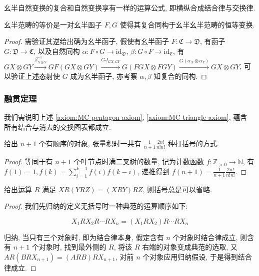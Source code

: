 \begin{corollary}
    幺半自然变换的复合和自然变换享有一样的运算公式, 即横纵合成结合律与交换律.
\end{corollary}

\begin{corollary}
    幺半范畴的等价是一对幺半函子 \(F,G\) 使得其复合同构于幺半幺半范畴的恒等变换.

    \begin{proof}
        需验证其逆给出确为幺半函子, 假使有幺半函子 \(F : \mathfrak{C} \to \mathfrak{D}\), 有函子 \(G : \mathfrak{D} \to \mathfrak{C}\), 
        以及自然同构 \(\alpha : F \circ G \to \mathrm{id}_\mathfrak{D}\), \(\beta : G \circ F \to \mathrm{id}_\mathfrak{C}\),
        有 \(GX \otimes GY \xrightarrow{\beta_{X \otimes Y}^{-1}} GF (GX \otimes GY) \xrightarrow{GJ_{GX,GY}} G(FGX \otimes FGY) \xrightarrow{G(\alpha_X \otimes \alpha_Y)} GX \otimes GY\),
        可以验证上述态射使 \(G\) 成为幺半函子, 亦考察 \(\alpha,\beta\) 知复合的同构.
    \end{proof}
\end{corollary}

\subsubsection{融贯定理}

我们需说明上述 \ref{axiom:MC pentagon axiom}, \ref{axiom:MC triangle axiom}, 蕴含
所有结合与消去的交换图表都成立.

\begin{lemma}
    给出 \(n + 1\) 个有顺序的对象, 张量积时一共有 \(\frac{1}{n+1} \frac{2n!}{n!n!}\) 种打括号的方式.

    \begin{proof}
        等同于有 \(n + 1\) 个叶节点时满二叉树的数量, 记为计数函数 \(f : \mathbb{Z}_{>0} \to \mathbb{N}\),
        有 \(f(1) = 1, f(k) = \sum_{i=1}^{k-1} f(i) f(k-i)\), 递推得到 \(f(n+1) = \frac{1}{n+1} \frac{2n!}{n!n!}\).
    \end{proof}
\end{lemma}

\begin{theorem}[结合律]
    给出运算 \(R\) 满足 \(X R (Y R Z) = (X R Y) R Z\), 则括号总是可以省略.

    \begin{proof}
        我们先归纳的定义无括号时一种典范的运算顺序如下:

        \[
            X_1 R X_2 R \cdots R X_n = (X_1 R X_2) R \cdots R X_n
        \]

        归纳, 当只有三个对象时, 即为结合律本身, 假定含有 \(n\) 个对象时结合律成立, 则含有 \(n+1\) 个对象时,
        找到最外侧的 \(R\), 将该 \(R\) 右端的对象变成典范的选取, 又 \(A R (B R X_{n+1}) = (A R B) R X_{n+1}\),
        对前 \(n\) 个对象应用归纳假设, 于是得到结合律成立.
    \end{proof}
\end{theorem}


